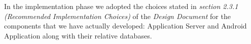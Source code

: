 In the implementation phase we adopted the choices stated in \textit{section 2.3.1 (Recommended Implementation Choices)} of the \textit{Design Document} for the components that we have actually developed: Application Server and Android Application along with their relative databases.